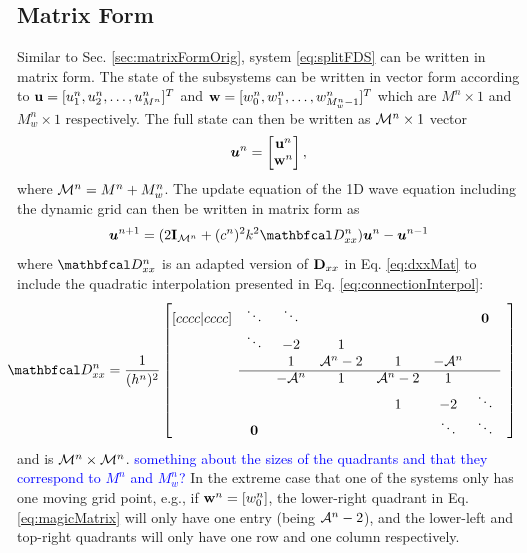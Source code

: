 \documentclass[fleqn]{jaes}
\def\SWcomment[#1]{\textcolor{blue}{#1}}
\begin{document}
\subsection{Matrix Form}\label{sec:matrixForm}
Similar to Sec. \ref{sec:matrixFormOrig}, system \eqref{eq:splitFDS} can be written in matrix form. The state of the subsystems can be written in vector form according to $\mathbf{u} = [u_1^n, u_2^n, \hdots, u_{M^n}^n]^T$ and $\mathbf{w} = [w_0^n, w_1^n, \hdots, w_{M_w^n-1}^n]^T$ which are $M^n \times 1$ and $M_w^n \times 1$ respectively. The full state can then be written as ${\mathcal{M}^n} \times 1$ vector
\begin{equation}\label{eq:uStack}
    \uStack^n = \begin{bmatrix}
    \u^n\\
    \w^n
    \end{bmatrix},
\end{equation}
where ${\mathcal{M}^n} = M^n + M_w^n$.
The update equation of the 1D wave equation including the dynamic grid can then be written in matrix form as
\begin{equation}\label{eq:1DwaveDynMatrix}
    \uStack^{n+1} = (2\I_\MoneD + (c^n)^2k^2\DDxx)\uStack^n - \uStack^{n-1} 
\end{equation}
where $\DDxx$ is an adapted version of $\mathbf{D}_{xx}$ in Eq. \eqref{eq:dxxMat} to include the quadratic interpolation presented in Eq. \eqref{eq:connectionInterpol}:
\begin{equation}\label{eq:magicMatrix}
    \!\!\!\!\!\!\DDxx = \frac{1}{(h^n)^2}\begin{bmatrix}[cccc|cccc]
     & \ddots  &\ddots & & & & \boldsymbol{0} & \\
       & \ddots & -2 & 1 & & & & \\
      & & 1 & \Aterm -2 & 1 & -\Aterm & \\ \cline{2-7}
      & & -\Aterm & 1 & \Aterm -2 & 1 & & \\
         & & & &1 & -2 & \ddots  \\
         & \boldsymbol{0} & &  &  &\ddots & \ddots &
    \end{bmatrix}
\end{equation}
and is ${\mathcal{M}^n} \times {\mathcal{M}^n}$. \SWcomment[something about the sizes of the quadrants and that they correspond to $M^n$ and $M_w^n$?] In the extreme case that one of the systems only has one moving grid point, e.g., if $\mathbf{w}^n =[w_0^n]$, the lower-right quadrant in Eq. \eqref{eq:magicMatrix} will only have one entry (being $\mathcal{A}^n-2$), and the lower-left and top-right quadrants will only have one row and one column respectively. 
\end{document}
